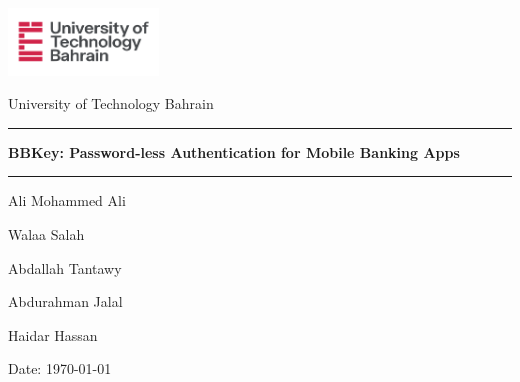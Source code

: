 \documentclass{article}[12pt]
\begin{document}
\begin{titlepage}
    \begin{center}
        \includegraphics[width=0.30\textwidth]{images/utb_logo.png}

        University of Technology Bahrain\\

        \vspace*{2cm}

        \rule{\textwidth}{1pt}

        \vspace{.7\baselineskip}
        {\huge \textbf{BBKey: Password-less Authentication for Mobile Banking Apps}}\\


        \rule{\textwidth}{1pt}

        \vspace{1cm}

        \large

        \begin{minipage}{.2\textwidth}
            \centering
            Ali Mohammed Ali
        \end{minipage}%
        \begin{minipage}{.2\textwidth}
            \centering
            Walaa Salah
        \end{minipage}%
        \begin{minipage}{.2\textwidth}
            \centering
            Abdallah Tantawy
        \end{minipage}%
        \begin{minipage}{.2\textwidth}
            \centering
            Abdurahman Jalal
        \end{minipage}%
        \begin{minipage}{.2\textwidth}
            \centering
            Haidar Hassan
        \end{minipage}%


        \vspace{1cm}

        Date: \today
    \end{center}

\end{titlepage}
\end{document}
